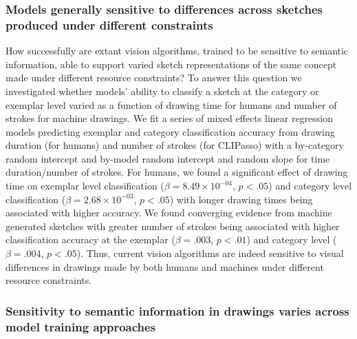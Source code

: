 \documentclass[10pt,letterpaper]{article}
\begin{document}
\subsubsection{Models generally sensitive to differences across sketches produced under different constraints}
How successfully are extant vision algorithms, trained to be sensitive to semantic information, able to support varied sketch representations of the same concept made under different resource constraints? 
To answer this question we investigated whether models' ability to classify a sketch at the category or exemplar level varied as a function of drawing time for humans and number of strokes for machine drawings. 
We fit a series of mixed effects linear regression models predicting exemplar and category classification accuracy from drawing duration (for humans) and number of strokes (for CLIPasso) with a by-category random intercept and by-model random intercept and random slope for time duration/number of strokes. 
For humans, we found a significant effect of drawing time on exemplar level classification ($\beta = 8.49\times10^{-04}$, $p < .05$) and category level classification ($\beta = 2.68\times10^{-03}$, $p < .05$) with longer drawing times being associated with higher accuracy. 
We found converging evidence from machine generated sketches with greater number of strokes being associated with higher classification accuracy at the exemplar ($\beta = .003$, $p < .01$) and category level ($\beta=.004$, $p < .05$).
Thus, current vision algorithms are indeed sensitive to visual differences in drawings made by both humans and machines under different resource constraints.

\subsubsection{Sensitivity to semantic information in drawings varies across model training approaches}
\end{document}
